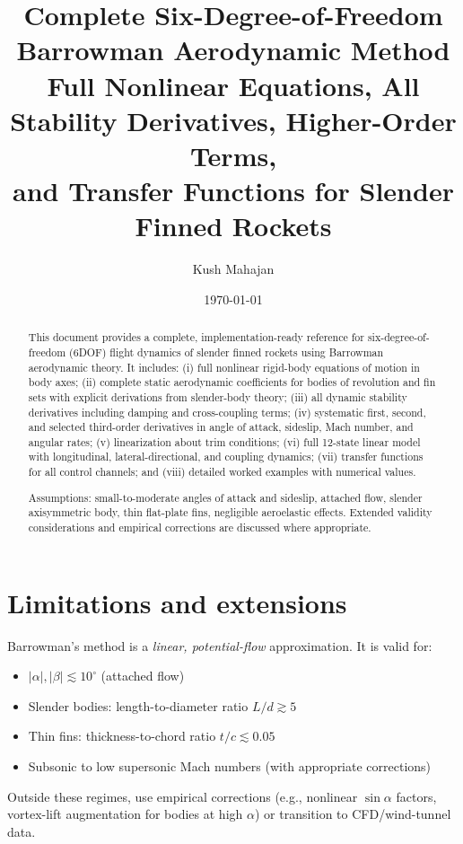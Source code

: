 \documentclass[11pt]{article}
\title{\textbf{Complete Six-Degree-of-Freedom Barrowman Aerodynamic Method}\\[6pt]
\large Full Nonlinear Equations, All Stability Derivatives, Higher-Order Terms,\\
and Transfer Functions for Slender Finned Rockets}
\author{Kush Mahajan}
\date{\today}
\begin{document}
\maketitle

\begin{abstract}
This document provides a complete, implementation-ready reference for six-degree-of-freedom (6DOF) flight dynamics of slender finned rockets using Barrowman aerodynamic theory. It includes: (i) full nonlinear rigid-body equations of motion in body axes; (ii) complete static aerodynamic coefficients for bodies of revolution and fin sets with explicit derivations from slender-body theory; (iii) all dynamic stability derivatives including damping and cross-coupling terms; (iv) systematic first, second, and selected third-order derivatives in angle of attack, sideslip, Mach number, and angular rates; (v) linearization about trim conditions; (vi) full 12-state linear model with longitudinal, lateral-directional, and coupling dynamics; (vii) transfer functions for all control channels; and (viii) detailed worked examples with numerical values. 

Assumptions: small-to-moderate angles of attack and sideslip, attached flow, slender axisymmetric body, thin flat-plate fins, negligible aeroelastic effects. Extended validity considerations and empirical corrections are discussed where appropriate.
\end{abstract}

\tableofcontents
\newpage

\section{Limitations and extensions}
Barrowman's method is a \emph{linear, potential-flow} approximation. It is valid for:
\begin{itemize}[leftmargin=2em]
\item $|\alpha|, |\beta| \lesssim 10^\circ$ (attached flow)
\item Slender bodies: length-to-diameter ratio $L/d \gtrsim 5$
\item Thin fins: thickness-to-chord ratio $t/c \lesssim 0.05$
\item Subsonic to low supersonic Mach numbers (with appropriate corrections)
\end{itemize}
Outside these regimes, use empirical corrections (e.g., nonlinear $\sin\alpha$ factors, vortex-lift augmentation for bodies at high $\alpha$) or transition to CFD/wind-tunnel data.
\end{document}
